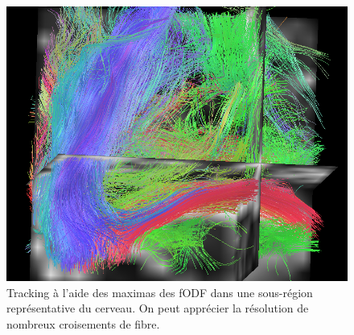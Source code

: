 \documentclass[a4paper]{article}
\begin{document}
\begin{figure}
\begin{center}
\includegraphics[width=.9\textwidth]{tracking_csd}
\caption{ Tracking à l'aide des maximas des fODF dans une sous-région représentative du cerveau. On peut apprécier la résolution de nombreux croisements de fibre. \label{tracking_csd}}
\end{center}
\end{figure}
\end{document}
